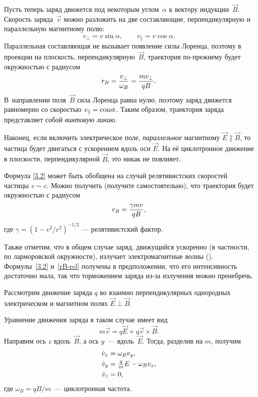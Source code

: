 Пусть теперь заряд движется под некоторым углом~$\alpha$ к вектору
индукции~$\vec{B}$. Скорость заряда~$\vec{v}$ можно разложить
на две составляющие, перпендикулярную и параллельную магнитному полю:
\begin{equation*}
    v_{\perp}=v\sin\alpha,\qquad v_{\parallel}=v\cos\alpha.
\end{equation*}
Параллельная составляющая не вызывает появление силы Лоренца, поэтому
в проекции на плоскость, перпендикулярную~$\vec{B}$,
траектория по-прежнему будет окружностью с радиусом
\begin{equation}
    \eqmark{3.4}
    r_B = \frac{v_{\perp}}{\omega_B} = \frac{m v_{\perp}}{qB}.
\end{equation}
В~направлении поля~$\vec{B}$ сила Лоренца равна нулю, поэтому заряд движется
равномерно со скоростью $v_{\parallel}=\mathrm{const}$.
Таким образом, траектория заряда представляет собой \emph{винтовую линию}.

Наконец, если включить электрическое поле, \emph{параллельное}
магнитному $\vec{E}\parallel\vec{B}$, то частица будет двигаться с ускорением
вдоль оси $\vec{E}$. На её циклотронное движение в плоскости, перпендикулярной
$\vec{B}$, это никак не повлияет.

\begin{lab:note}
Формула \eqref{3.2} может быть обобщена на случай релятивистских скоростей
частицы $v\sim c$. Можно получить (получите самостоятельно),
что траектория будет окружностью с радиусом
\begin{equation}
\eqmark{rB-rel}
    r_B = \frac{\gamma m v}{qB},
\end{equation}
где $\gamma = (1-v^2/c^2)^{-1/2}$ --- релятивистский фактор.

Также отметим, что в общем случае заряд, движущийся ускоренно (в частности,
по ларморовской окружности), излучает электромагнитные волны
(). Формулы~\eqref{3.2} и~\eqref{rB-rel} получены в
предположении, что его интенсивность достаточно мала,
так что торможением заряда из-за излучения можно пренебречь.
\end{lab:note}



Рассмотрим движение заряда $q$ во взаимно перпендикулярных однородных
электрическом и магнитном полях $\vec{E}\perp\vec{B}$.

Уравнение движения заряда в таком случае имеет вид
\[
m\dot{\vec{v}} = q\vec{E} + q \vec{v}\times \vec{B}.
\]
Направим ось $z$ вдоль~$\vec{B}$, а ось $y$~--- вдоль~$\vec{E}$.
Тогда, разделив на $m$, получим
\begin{equation}
    \eqmark{3.9}
    \begin{aligned}
        \dot{v}_x&=\omega_B v_y,\\
        \dot{v}_y&=\tfrac{q}{m}E-\omega_B v_x,\\
        \dot{v}_z&=0,
\end{aligned}
\end{equation}
где $\omega_B = qB/m$~--- циклотронная частота.

